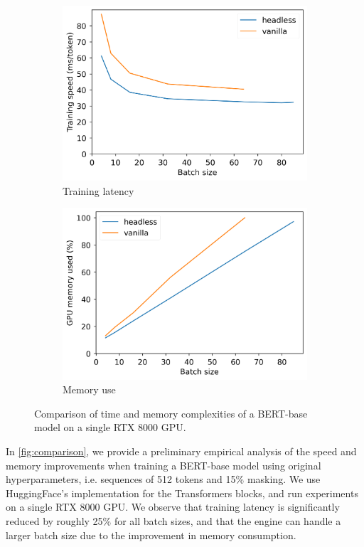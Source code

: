 \begin{figure}[h]
    \centering
    \begin{subfigure}{0.40\columnwidth}
         \includegraphics[width=\linewidth]{sources/part_2/headless/imgs/bert_train_speed_p13.png}
         \caption{Training latency}
         \label{fig:speedup}
    \end{subfigure}
    \begin{subfigure}{0.41\columnwidth}
         \includegraphics[width=\linewidth]{sources/part_2/headless/imgs/bert_memory_use_p13.png}
         \caption{Memory use}
         \label{fig:norm_scratch_transformer}
    \end{subfigure}
    \caption{Comparison of time and memory complexities of a BERT-base model on a single RTX 8000 GPU.}
    \label{fig:comparison}
\end{figure}
In \autoref{fig:comparison}, we provide a preliminary empirical analysis of the speed and memory improvements when training a BERT-base model using original hyperparameters, i.e. sequences of 512 tokens and 15\% masking. We use HuggingFace's implementation for the Transformers blocks, and run experiments on a single RTX 8000 GPU.
We observe that training latency is significantly reduced by roughly 25\% for all batch sizes, and that the engine can handle a larger batch size due to the improvement in memory consumption.

